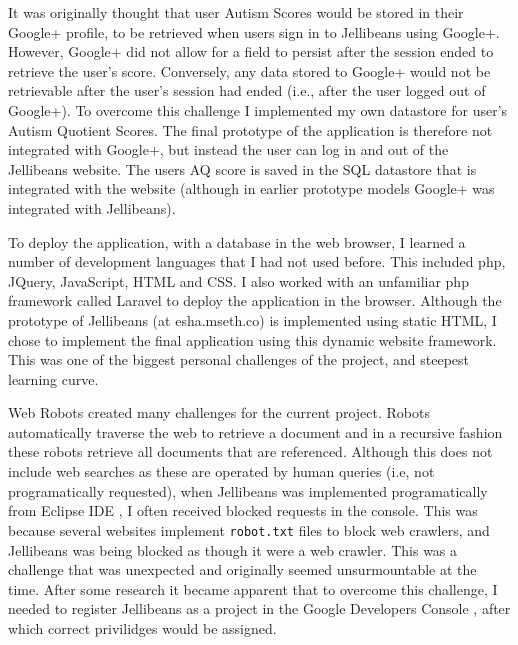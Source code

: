\documentclass[a4paper, 11pt]{article}
\begin{document}
\vspace{5mm}
It was originally thought that user Autism Scores would be stored in their Google+ profile, to be retrieved when users sign in to Jellibeans using Google+. However, Google+ did not allow for a field to persist after the session ended to retrieve the user's score. Conversely, any data stored to Google+ would not be retrievable after the user's session had ended (i.e., after the user logged out of Google+). To overcome this challenge I implemented my own datastore for user's Autism Quotient Scores. The final prototype of the application is therefore not integrated with Google+, but instead the user can log in and out of the Jellibeans website. The users AQ score is saved in the SQL datastore that is integrated with the website (although in earlier prototype models Google+ was integrated with Jellibeans).

\vspace{5mm}
To deploy the application, with a database in the web browser, I learned a number of development languages that I had not used before. This included php, JQuery, JavaScript, HTML and CSS. I also worked with an unfamiliar php framework called Laravel\cite{laravel} to deploy the application in the browser. Although the prototype of Jellibeans (at esha.mseth.co) is implemented using static HTML, I chose to implement the final application using this dynamic website framework. This was one of the biggest personal challenges of the project, and steepest learning curve. 

\vspace{5mm}
Web Robots created many challenges for the current project. Robots automatically traverse the web to retrieve a document and in a recursive fashion these robots retrieve all documents that are referenced. Although this does not include web searches as these are operated by human queries (i.e, not programatically requested), when Jellibeans was implemented programatically from Eclipse IDE \cite{eclipse}, I often received blocked requests in the console. This was because several websites implement \texttt{robot.txt} files to block web crawlers, and Jellibeans was being blocked as though it were a web crawler. This was a challenge that was unexpected and originally seemed unsurmountable at the time. After some research it became apparent that to overcome this challenge, I needed to register Jellibeans as a project in the Google Developers Console \cite{GDC}, after which correct privilidges would be assigned.

\end{document}
